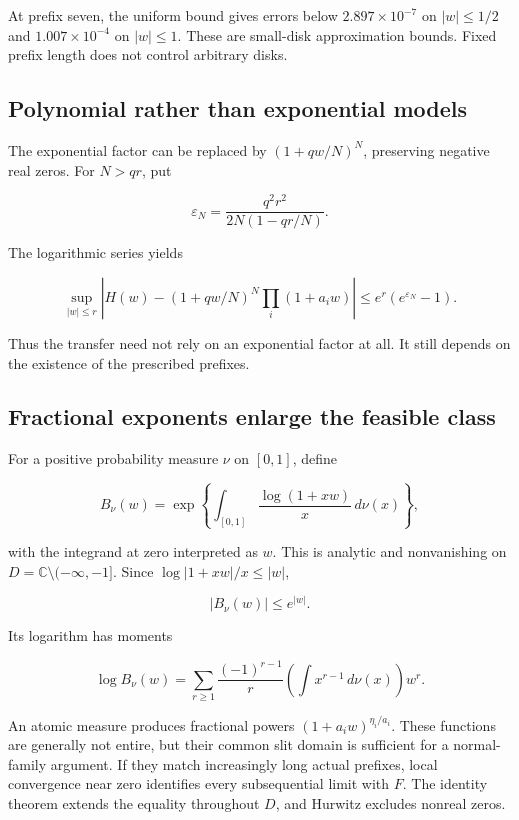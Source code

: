 \documentclass[
  10pt,
  a4paper,
  10pt,
  oneside,
  openany]{book}
\begin{document}
At prefix seven, the uniform bound gives errors below
\(2.897\times10^{-7}\) on \(|w|\le1/2\) and \(1.007\times10^{-4}\) on
\(|w|\le1\). These are small-disk approximation bounds. Fixed prefix
length does not control arbitrary disks.

\subsection{Polynomial rather than exponential
models}\label{polynomial-rather-than-exponential-models}

The exponential factor can be replaced by \((1+qw/N)^N\), preserving
negative real zeros. For \(N>qr\), put

\[
\varepsilon_N=\frac{q^2r^2}{2N(1-qr/N)}.
\tag{20.6}\label{eq:20.6}
\]

The logarithmic series yields

\[
\sup_{|w|\le r}\left|
H(w)-(1+qw/N)^N\prod_i(1+a_iw)\right|
\le e^r(e^{\varepsilon_N}-1).
\tag{20.7}\label{eq:20.7}
\]

Thus the transfer need not rely on an exponential factor at all. It
still depends on the existence of the prescribed prefixes.

\subsection{Fractional exponents enlarge the feasible
class}\label{fractional-exponents-enlarge-the-feasible-class}

For a positive probability measure \(\nu\) on \([0,1]\), define

\[
B_\nu(w)=\exp\left\{
\int_{[0,1]}\frac{\log(1+xw)}x\,d\nu(x)\right\},
\tag{20.8}\label{eq:20.8}
\]

with the integrand at zero interpreted as \(w\). This is analytic and
nonvanishing on \(D=\mathbb C\setminus(-\infty,-1]\). Since
\(\log|1+xw|/x\le|w|\),

\[
|B_\nu(w)|\le e^{|w|}.
\tag{20.9}\label{eq:20.9}
\]

Its logarithm has moments

\[
\log B_\nu(w)
=\sum_{r\ge1}\frac{(-1)^{r-1}}r
\left(\int x^{r-1}\,d\nu(x)\right)w^r.
\tag{20.10}\label{eq:20.10}
\]

An atomic measure produces fractional powers \((1+a_iw)^{\eta_i/a_i}\).
These functions are generally not entire, but their common slit domain
is sufficient for a normal-family argument. If they match increasingly
long actual prefixes, local convergence near zero identifies every
subsequential limit with \(F\). The identity theorem extends the
equality throughout \(D\), and Hurwitz excludes nonreal zeros.
\end{document}
